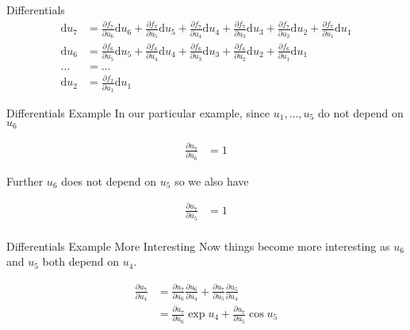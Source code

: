 \documentclass{beamer}
\begin{document}
\begin{frame}[fragile]{Differentials}
$$
\begin{aligned}
\mathrm{d}u_7    &= \frac{\partial f_7}{\partial u_6} \mathrm{d} u_6 +
                    \frac{\partial f_7}{\partial u_5} \mathrm{d} u_5 +
                    \frac{\partial f_7}{\partial u_4} \mathrm{d} u_4 +
                    \frac{\partial f_7}{\partial u_3} \mathrm{d} u_3 +
                    \frac{\partial f_7}{\partial u_2} \mathrm{d} u_2 +
                    \frac{\partial f_7}{\partial u_1} \mathrm{d} u_1 \\
\mathrm{d}u_6    &= \frac{\partial f_6}{\partial u_5} \mathrm{d} u_5 +
                    \frac{\partial f_6}{\partial u_4} \mathrm{d} u_4 +
                    \frac{\partial f_6}{\partial u_3} \mathrm{d} u_3 +
                    \frac{\partial f_6}{\partial u_2} \mathrm{d} u_2 +
                    \frac{\partial f_6}{\partial u_1} \mathrm{d} u_1 \\
\ldots           &= \ldots \\
\mathrm{d}u_2    &= \frac{\partial f_2}{\partial u_1} \mathrm{d} u_1
\end{aligned}
$$
\end{frame}

\begin{frame}[fragile]{Differentials Example}
In our particular example, since $u_1, \dots, u_5$ do not depend on $u_6$

$$
\begin{aligned}
\frac{\partial u_7}{\partial u_6} &= 1
\end{aligned}
$$

Further $u_6$ does not depend on $u_5$ so we also have

$$
\begin{aligned}
\frac{\partial u_7}{\partial u_5} &= 1 \\
\end{aligned}
$$
\end{frame}

\begin{frame}[fragile]{Differentials Example More Interesting}
Now things become more interesting as $u_6$ and $u_5$ both depend on
$u_4$.

$$
\begin{aligned}
\frac{\partial u_7}{\partial u_4} &=
 \frac{\partial u_7}{\partial u_6}\frac{\partial u_6}{\partial u_4} +
 \frac{\partial u_7}{\partial u_5}\frac{\partial u_5}{\partial u_4} \\
&= \frac{\partial u_7}{\partial u_6}\exp{u_4} +
   \frac{\partial u_7}{\partial u_5}\cos{u_5}
\end{aligned}
$$
\end{frame}
\end{document}

